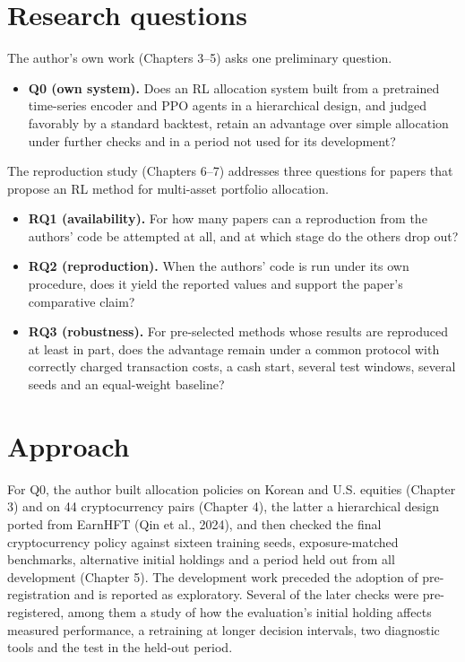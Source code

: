 \documentclass[12pt,a4paper]{report}
\providecommand{\tightlist}{\setlength{\itemsep}{0pt}\setlength{\parskip}{0pt}}
\begin{document}
\section{Research questions}\label{research-questions}

The author's own work (Chapters 3--5) asks one preliminary question.

\begin{itemize}
\tightlist
\item
  \textbf{Q0 (own system).} Does an RL allocation system built from a
  pretrained time-series encoder and PPO agents in a hierarchical
  design, and judged favorably by a standard backtest, retain an
  advantage over simple allocation under further checks and in a period
  not used for its development?
\end{itemize}

The reproduction study (Chapters 6--7) addresses three questions for
papers that propose an RL method for multi-asset portfolio allocation.

\begin{itemize}
\tightlist
\item
  \textbf{RQ1 (availability).} For how many papers can a reproduction
  from the authors' code be attempted at all, and at which stage do the
  others drop out?
\item
  \textbf{RQ2 (reproduction).} When the authors' code is run under its
  own procedure, does it yield the reported values and support the
  paper's comparative claim?
\item
  \textbf{RQ3 (robustness).} For pre-selected methods whose results are
  reproduced at least in part, does the advantage remain under a common
  protocol with correctly charged transaction costs, a cash start,
  several test windows, several seeds and an equal-weight baseline?
\end{itemize}

\section{Approach}\label{approach}

For Q0, the author built allocation policies on Korean and U.S. equities
(Chapter 3) and on 44 cryptocurrency pairs (Chapter 4), the latter a
hierarchical design ported from EarnHFT (Qin et al., 2024), and then
checked the final cryptocurrency policy against sixteen training seeds,
exposure-matched benchmarks, alternative initial holdings and a period
held out from all development (Chapter 5). The development work preceded
the adoption of pre-registration and is reported as exploratory. Several
of the later checks were pre-registered, among them a study of how the
evaluation's initial holding affects measured performance, a retraining
at longer decision intervals, two diagnostic tools and the test in the
held-out period.
\end{document}
